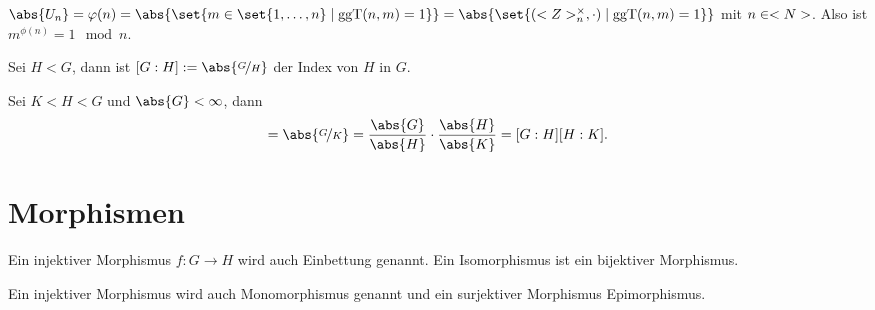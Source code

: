 \begin{conclusion}
	$\abs{U_n} = \phi(n) = \abs{\set{m \in \set{1, \dots,n} \mid \ggT(n,m) = 1}} = \abs{\set{(\Z_n^{\times}, \cdot) \mid \ggT(n,m) = 1}}$ mit $n \in <N>$. Also ist $m^{\phi(n)} = 1 \mod n$.
\end{conclusion}
\begin{definition}[Index]
	Sei $H < G$, dann ist $[G:H] := \abs{\lnkset{G}{H}}$ der Index von $H$ in $G$.
\end{definition}

\begin{conclusion}
	Sei $K < H < G$ und $\abs{G} < \infty$, dann
	\begin{align*}
		[G:K] = \abs{\lnkset{G}{K}} = \frac{\abs{G}}{\abs{H}}\cdot \frac{\abs{H}}{\abs{K}} = [G:H][H:K].
	\end{align*}
\end{conclusion}

\section{Morphismen}
\begin{definition}
	Ein injektiver Morphismus $f\colon G \to H$ wird auch Einbettung genannt. Ein Isomorphismus ist ein bijektiver Morphismus.
\end{definition}

\begin{*remark}
	Ein injektiver Morphismus wird auch Monomorphismus genannt und ein surjektiver Morphismus Epimorphismus.
\end{*remark}

